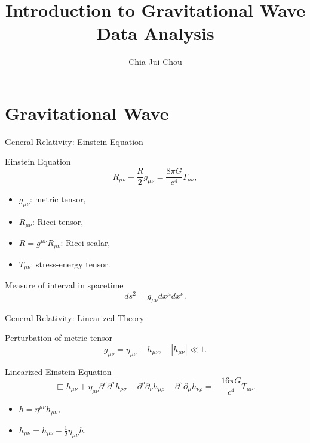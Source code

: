 \documentclass[xcolor=dvipsnames]{beamer}
\title[Introduction to Gravitational Wave Data Analysis]
{Introduction to Gravitational Wave Data Analysis}
\author[Chia-Jui Chou]
{\Large{Chia-Jui Chou}}
\institute[2025/04/17]
{National Yang Ming Chiao Tung University, Taiwan}
\date[2025/04/17]
{}
\begin{document}
\begin{frame}
  \titlepage
\end{frame}


\setcounter{equation}{0}
\renewcommand{\theequation}{\arabic{section}.\arabic{equation}}

\section[GW]{Gravitational Wave}

\begin{frame}[t]{General Relativity: Einstein Equation}
  \begin{block}{Einstein Equation}
    \begin{equation*}
      R_{\mu\nu} - \frac{R}{2} g_{\mu\nu} = \frac{8\pi G}{c^4} T_{\mu\nu},
    \end{equation*}
  \end{block}
  \begin{itemize}
    \item $g_{\mu\nu}$: metric tensor,
    \item $R_{\mu\nu}$: Ricci tensor,
    \item $R = g^{\mu\nu} R_{\mu\nu}$: Ricci scalar,
    \item $T_{\mu\nu}$: stress-energy tensor.
  \end{itemize}
  \begin{block}{Measure of interval in spacetime}
    \begin{equation*}
      ds^2 = g_{\mu\nu} dx^\mu dx^\nu.
    \end{equation*}
  \end{block}
\end{frame}

\begin{frame}[t]{General Relativity: Linearized Theory}
  \begin{block}{Perturbation of metric tensor}
    \begin{equation*}
      g_{\mu\nu} = \eta_{\mu\nu} + h_{\mu\nu}, \quad |h_{\mu\nu}| \ll 1.
    \end{equation*}
  \end{block}
  \begin{block}{Linearized Einstein Equation}
    \begin{equation*}
      \Box \bar{h}_{\mu\nu} + \eta_{\mu\nu} \partial^\rho \partial^\sigma \bar{h}_{\rho\sigma} - \partial^\rho \partial_\nu \bar{h}_{\mu\rho} - \partial^\sigma \partial_\mu \bar{h}_{\nu\rho} = -\frac{16\pi G}{c^4} T_{\mu\nu}.
    \end{equation*}
  \end{block}
  \begin{itemize}
    \item $h = \eta^{\mu\nu} h_{\mu\nu}$,
    \item $\bar{h}_{\mu\nu} = h_{\mu\nu} - \frac{1}{2} \eta_{\mu\nu} h$.
  \end{itemize}
\end{frame}
\end{document}
